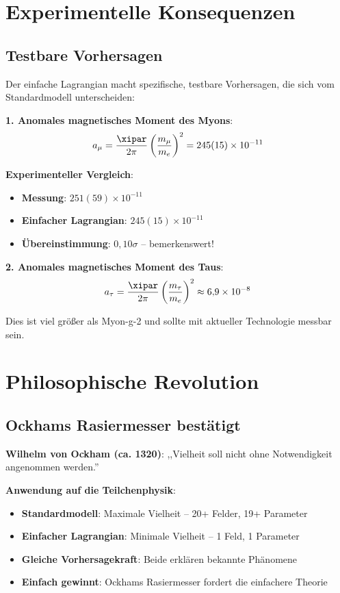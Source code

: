 	\section{Experimentelle Konsequenzen}
	
	\subsection{Testbare Vorhersagen}
	
	Der einfache Lagrangian macht spezifische, testbare Vorhersagen, die sich vom Standardmodell unterscheiden:
	
	\textbf{1. Anomales magnetisches Moment des Myons}:
	\begin{equation}
		a_{\mu} = \frac{\xipar}{2\pi} \left(\frac{m_{\mu}}{m_e}\right)^2 = 245(15) \times 10^{-11}
	\end{equation}
	
	\textbf{Experimenteller Vergleich}:
	\begin{itemize}
		\item \textbf{Messung}: $251(59) \times 10^{-11}$
		\item \textbf{Einfacher Lagrangian}: $245(15) \times 10^{-11}$
		\item \textbf{Übereinstimmung}: $0{,}10\sigma$ -- bemerkenswert!
	\end{itemize}
	
	\textbf{2. Anomales magnetisches Moment des Taus}:
	\begin{equation}
		a_{\tau} = \frac{\xipar}{2\pi} \left(\frac{m_{\tau}}{m_e}\right)^2 \approx 6{,}9 \times 10^{-8}
	\end{equation}
	
	Dies ist viel größer als Myon-g-2 und sollte mit aktueller Technologie messbar sein.
	
	\section{Philosophische Revolution}
	
	\subsection{Ockhams Rasiermesser bestätigt}
	
	\begin{tcolorbox}[colback=blue!5!white,colframe=blue!75!black,title=Ockhams Rasiermesser in Reinform]
		\textbf{Wilhelm von Ockham (ca. 1320)}: ,,Vielheit soll nicht ohne Notwendigkeit angenommen werden.''
		
		\textbf{Anwendung auf die Teilchenphysik}:
		\begin{itemize}
			\item \textbf{Standardmodell}: Maximale Vielheit -- 20+ Felder, 19+ Parameter
			\item \textbf{Einfacher Lagrangian}: Minimale Vielheit -- 1 Feld, 1 Parameter
			\item \textbf{Gleiche Vorhersagekraft}: Beide erklären bekannte Phänomene
			\item \textbf{Einfach gewinnt}: Ockhams Rasiermesser fordert die einfachere Theorie
		\end{itemize}
	\end{tcolorbox}
	
